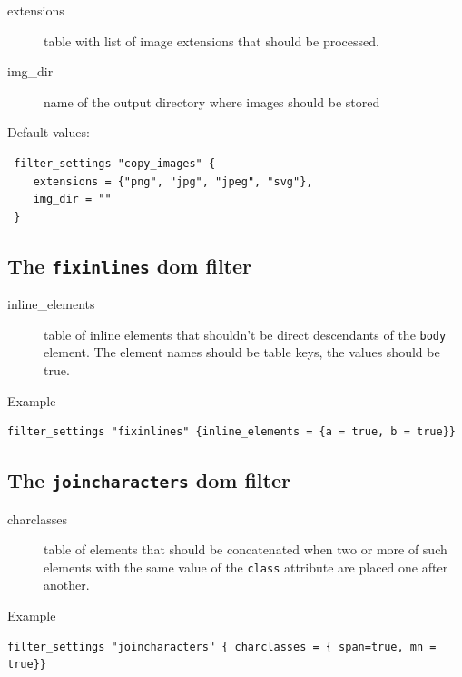 \begin{description}
\item[extensions]
table with list of image extensions that should be processed.
\item[img\_dir]
name of the output directory where images should be stored
\end{description}

Default values:

\begin{verbatim}
 filter_settings "copy_images" {
    extensions = {"png", "jpg", "jpeg", "svg"},
    img_dir = ""
 }
\end{verbatim}

\subsection{\texorpdfstring{The \texttt{fixinlines} dom
filter}{The fixinlines dom filter}}\label{the-fixinlines-dom-filter}

\begin{description}
\item[inline\_elements]
table of inline elements that shouldn't be direct descendants of the
\texttt{body} element. The element names should be table keys, the
values should be true.
\end{description}

Example

\begin{verbatim}
filter_settings "fixinlines" {inline_elements = {a = true, b = true}}
\end{verbatim}

\subsection{\texorpdfstring{The \texttt{joincharacters} dom
filter}{The joincharacters dom filter}}\label{the-joincharacters-dom-filter}

\begin{description}
\item[charclasses]
table of elements that should be concatenated when two or more of such
elements with the same value of the \texttt{class} attribute are placed
one after another.
\end{description}

Example

\begin{verbatim}
filter_settings "joincharacters" { charclasses = { span=true, mn = true}}
\end{verbatim}

